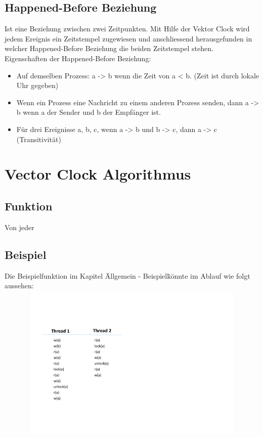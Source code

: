 \documentclass[10pt,a4paper]{article}
\begin{document}
\subsection{Happened-Before Beziehung}
\begin{flushleft}
Ist eine Beziehung zwischen zwei Zeitpunkten. Mit Hilfe der Vektor Clock wird jedem Ereignis ein Zeitstempel zugewiesen und anschliessend herausgefunden in welcher Happened-Before Beziehung die beiden Zeitstempel stehen.\\
Eigenschaften der Happened-Before Beziehung:
\begin{itemize}
\item Auf demselben Prozess: a -> b wenn die Zeit von a < b. (Zeit ist durch lokale Uhr gegeben)
\item Wenn ein Prozess eine Nachricht zu einem anderen Prozess senden, dann a -> b wenn a der Sender und b der Empfänger ist.
\item Für drei Ereignisse a, b, c, wenn a -> b und b -> c, dann a -> c (Transitivität)
\end{itemize}
\end{flushleft}
\newpage
\section{Vector Clock Algorithmus}
\subsection{Funktion}
Von jeder
\subsection{Beispiel}
\begin{flushleft}
Die Beispielfunktion im Kapitel \"Allgemein - Beispiel\" könnte im Ablauf wie folgt aussehen:
	\includegraphics[width=16cm,height=7.5cm,trim=10mm 40mm 0mm 30mm, clip]{pictures/Beispiel_Ablauf.pdf}
\end{flushleft}
\end{document}
